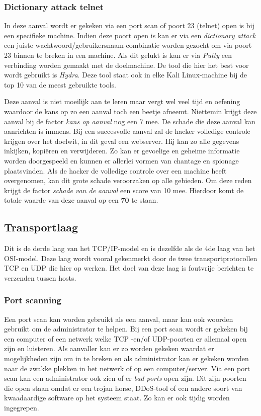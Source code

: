 \documentclass[pdftex,a4paper,12pt]{report}
\begin{document}
\subsubsection{Dictionary attack telnet}
In deze aanval wordt er gekeken via een port scan of poort 23 (telnet) open is bij een specifieke machine. Indien deze poort open is kan er via een \textit{dictionary attack} een juiste wachtwoord/gebruikersnaam-combinatie worden gezocht om via poort 23 binnen te breken in een machine. Als dit gelukt is kan er via \textit{Putty} een verbinding worden gemaakt met de doelmachine. De tool die hier het best voor wordt gebruikt is \textit{Hydra}. Deze tool staat ook in elke Kali Linux-machine bij de top 10 van de meest gebruikte tools. \citep{Wilde2013} \newline

Deze aanval is niet moeilijk aan te leren maar vergt wel veel tijd en oefening waardoor de kans op zo een aanval toch een beetje afneemt. Niettemin krijgt deze aanval bij de factor \textit{kans op aanval} nog een 7 mee. De schade die deze aanval kan aanrichten is immens. Bij een succesvolle aanval zal de hacker volledige controle krijgen over het doelwit, in dit geval een webserver. Hij kan zo alle gegevens inkijken, kopiëren en verwijderen. Zo kan er gevoelige en geheime informatie worden doorgespeeld en kunnen er allerlei vormen van chantage en spionage plaatsvinden. Als de hacker de volledige controle over een machine heeft overgenomen, kan dit grote schade veroorzaken op alle gebieden. Om deze reden krijgt de factor \textit{schade van de aanval} een score van 10 mee. Hierdoor komt de totale waarde van deze aanval op een \textbf{70} te staan.

\subsection{Transportlaag}
Dit is de derde laag van het TCP/IP-model en is dezelfde als de 4de laag van het OSI-model. Deze laag wordt vooral gekenmerkt door de twee transportprotocollen TCP en UDP die hier op werken. Het doel van deze laag is foutvrije berichten te verzenden tussen hosts. \citep{Thomas2013}

\subsubsection{Port scanning}
Een port scan kan worden gebruikt als een aanval, maar kan ook woorden gebruikt om de administrator te helpen. Bij een port scan wordt er gekeken bij een computer of een netwerk welke TCP -en/of UDP-poorten er allemaal open zijn en luisteren. Als aanvaller kan er zo worden gekeken waardat er mogelijkheden zijn om in te breken en als administrator kan er gekeken worden naar de zwakke plekken in het netwerk of op een computer/server. Via een port scan kan een administrator ook zien of er \textit{bad ports} open zijn. Dit zijn poorten die open staan omdat er een trojan horse, DDoS-tool of een andere soort van kwaadaardige software op het systeem staat. Zo kan er ook tijdig worden ingegrepen. \citep{Kessler2001} \newline
\end{document}
